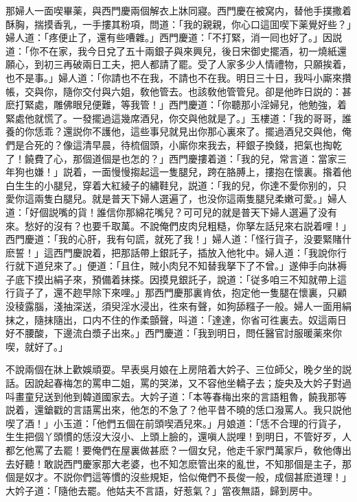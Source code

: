 那婦人一面喫畢薬，與西門慶兩個解衣上牀同寢。西門慶在被窝内，替他手撲撒着酥胸，揣摸香乳，一手摟其粉項，問道：「我的親親，你心口這囬喫下薬覺好些？」婦人道：「疼便止了，還有些嘈雜。」西門慶道：「不打緊，消一囘也好了。」因説道：「你不在家，我今日兌了五十兩銀子與來興兒，後日宋御史擺酒，初一燒紙還願心，到初三再破兩日工夫，把人都請了罷。受了人家多少人情禮物，只願挨着，也不是事。」婦人道：「你請也不在我，不請也不在我。明日三十日，我呌小廝來攢帳，交與你，隨你交付與六姐，敎他管去。也該敎他管管兒。卻是他昨日説的：甚麽打緊處，雕佛眼兒便難，等我管！」西門慶道：「你聽那小淫婦兒，他勉強，着緊處他就慌了。一發擺過這幾席酒兒，你交與他就是了。」玉樓道：「我的哥哥，誰養的你恁乖？還説你不護他，這些事兒就見出你那心裏來了。擺過酒兒交與他，俺們是合死的？像這清早晨，待梳個頭，小廝你來我去，秤銀子換錢，把氣也掏乾了！饒費了心，那個道個是也怎的？」西門慶摟着道：「我的兒，常言道：當家三年狗也嫌！」説着，一面慢慢搊起這一隻腿兒，跨在胳膊上，摟抱在懷裏。揝着他白生生的小腿兒，穿着大紅綾子的繡鞋兒，説道：「我的兒，你達不愛你别的，只愛你這兩隻白腿兒。就是普天下婦人選遍了，也没你這兩隻腿兒柔嫩可愛。」婦人道：「好個説嘴的貨！誰信你那綿花嘴兒？可可兒的就是普天下婦人選遍了没有來。愁好的沒有？也要千取萬。不說俺們皮肉兒粗糙，你拏左話兒來右説着哩！」西門慶道：「我的心肝，我有句謊，就死了我！」婦人道：「怪行貨子，没要緊賭什麽誓！」這西門慶說着，把那話帶上銀託子，插放入他牝中。婦人道：「我說你行行就下道兒來了。」便道：「且住，賊小肉兒不知替我拏下了不曾。」遂伸手向牀褥子底下摸出絹子來，預備着抹搽。因摸見銀託子，說道：「従多咱三不知就帶上這行貨子了，還不趂早除下來哩。」那西門慶那裏肯依，抱定他一隻腿在懷裏，只顧没稜露腦，淺抽深送，須臾淫水浸出，徃來有聲，如狗舔糨子一般。婦人一面用絹抹之，隨抹隨出，口内不住的作柔顫聲，呌道：「達達，你省可徃裏去。奴這兩日好不腰酸，下邊流白漿子出來。」西門慶道：「我到明日，問任醫官討服暖薬來你喫，就好了。」

不說兩個在牀上歡娛頑耍。早表吳月娘在上房陪着大妗子、三位師父，晚夕坐的説話。因說起春梅怎的罵申二姐，罵的哭涕，又不容他坐轎子去；旋央及大妗子對過呌畫童兒送到他到韓道國家去。大妗子道：「本等春梅出來的言語粗魯，饒我那等説着，還鎗戳的言語罵出來，他怎的不急了？他平昔不曉的恁口潑罵人。我只説他喫了酒！」小玉道：「他們五個在前頭喫酒兒來。」月娘道：「恁不合理的行貨子，生生把個丫頭慣的恁沒大沒小、上頭上臉的，還嗔人説哩！到明日，不管好歹，人都乞他罵了去罷！要俺們在屋裏做甚麽？一個女兒，他走千家門萬家戶，敎他傳出去好聽！敢説西門慶家那大老婆，也不知怎麽管出來的亂世，不知那個是主子，那個是奴才。不説你們這等慣的沒些規矩，恰似俺們不長俊一般，成個甚麽道理！」大妗子道：「隨他去罷。他姑夫不言語，好惹氣？」當夜無語，歸到房中。

